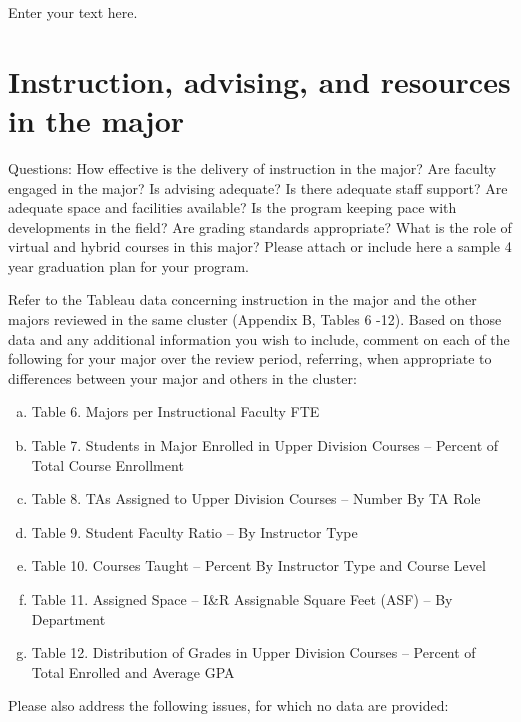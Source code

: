 \documentclass[12pt]{article}
\begin{document}
Enter your text here.


\section{Instruction, advising, and resources in the major}
Questions: How effective is the delivery of instruction in the major? Are faculty engaged in the major? Is advising adequate? Is there adequate staff support? Are adequate space and facilities available? Is the program keeping pace with developments in the field? Are grading standards appropriate? What is the role of virtual and hybrid courses in this major? Please attach or include here a sample 4 year graduation plan for your program.

Refer to the Tableau data concerning instruction in the major and the other majors reviewed in the same cluster (Appendix B, Tables 6 -12). Based on those data and any additional information you wish to include, comment on each of the following for your major over the review period, referring, when appropriate to differences between your major and others in the cluster:
\begin{enumerate}[a)]
 \item Table 6.  Majors per Instructional Faculty FTE
 \item Table 7.  Students in Major Enrolled in Upper Division Courses – Percent of Total Course Enrollment 
 \item Table 8.  TAs Assigned to Upper Division Courses – Number By TA Role 
 \item Table 9.  Student Faculty Ratio – By Instructor Type 
 \item Table 10.  Courses Taught – Percent By Instructor Type and Course Level 
 \item Table 11.  Assigned Space – I\&R Assignable Square Feet (ASF) – By Department
 \item Table 12.  Distribution of Grades in Upper Division Courses – Percent of Total Enrolled and Average GPA 
\end{enumerate}
   
\noindent
Please also address the following issues, for which no data are provided:\\
\end{document}
